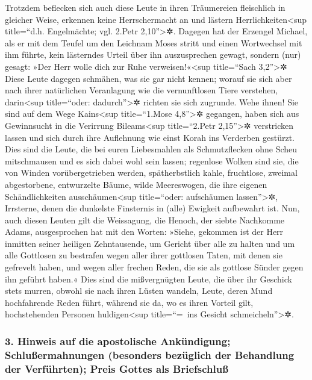  Trotzdem beflecken sich auch diese Leute in ihren
Träumereien fleischlich in gleicher Weise, erkennen keine Herrschermacht
an und lästern Herrlichkeiten\textless sup title=``d.h. Engelmächte;
vgl. 2.Petr 2,10''\textgreater✲.  Dagegen hat der Erzengel
Michael, als er mit dem Teufel um den Leichnam Moses stritt und einen
Wortwechsel mit ihm führte, kein lästerndes Urteil über ihn
auszusprechen gewagt, sondern (nur) gesagt: »Der Herr wolle dich zur
Ruhe verweisen!«\textless sup title=``Sach 3,2''\textgreater✲
 Diese Leute dagegen schmähen, was sie gar nicht kennen;
worauf sie sich aber nach ihrer natürlichen Veranlagung wie die
vernunftlosen Tiere verstehen, darin\textless sup title=``oder:
dadurch''\textgreater✲ richten sie sich zugrunde.  Wehe
ihnen! Sie sind auf dem Wege Kains\textless sup title=``1.Mose
4,8''\textgreater✲ gegangen, haben sich aus Gewinnsucht in die Verirrung
Bileams\textless sup title=``2.Petr 2,15''\textgreater✲ verstricken
lassen und sich durch ihre Auflehnung wie einst Korah ins Verderben
gestürzt.  Dies sind die Leute, die bei euren
Liebesmahlen als Schmutzflecken ohne Scheu mitschmausen und es sich
dabei wohl sein lassen; regenlose Wolken sind sie, die von Winden
vorübergetrieben werden, spätherbstlich kahle, fruchtlose, zweimal
abgestorbene, entwurzelte Bäume,  wilde Meereswogen, die
ihre eigenen Schändlichkeiten ausschäumen\textless sup title=``oder:
aufschäumen lassen''\textgreater✲, Irrsterne, denen die dunkelste
Finsternis in (alle) Ewigkeit aufbewahrt ist.  Nun, auch
diesen Leuten gilt die Weissagung, die Henoch, der siebte Nachkomme
Adams, ausgesprochen hat mit den Worten: »Siehe, gekommen ist der Herr
inmitten seiner heiligen Zehntausende,  um Gericht über
alle zu halten und um alle Gottlosen zu bestrafen wegen aller ihrer
gottlosen Taten, mit denen sie gefrevelt haben, und wegen aller frechen
Reden, die sie als gottlose Sünder gegen ihn geführt haben.«
 Dies sind die mißvergnügten Leute, die über ihr Geschick
stets murren, obwohl sie nach ihren Lüsten wandeln, Leute, deren Mund
hochfahrende Reden führt, während sie da, wo es ihren Vorteil gilt,
hochstehenden Personen huldigen\textless sup title=``=~ins Gesicht
schmeicheln''\textgreater✲.

\hypertarget{hinweis-auf-die-apostolische-ankuxfcndigung-schluuxdfermahnungen-besonders-bezuxfcglich-der-behandlung-der-verfuxfchrten-preis-gottes-als-briefschluuxdf}{%
\subsubsection{3. Hinweis auf die apostolische Ankündigung;
Schlußermahnungen (besonders bezüglich der Behandlung der Verführten);
Preis Gottes als
Briefschluß}\label{hinweis-auf-die-apostolische-ankuxfcndigung-schluuxdfermahnungen-besonders-bezuxfcglich-der-behandlung-der-verfuxfchrten-preis-gottes-als-briefschluuxdf}}

